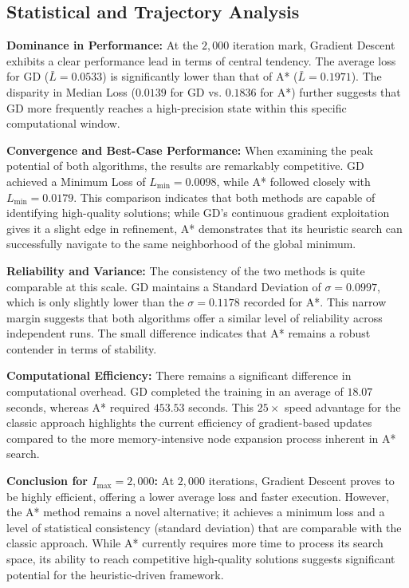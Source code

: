 \subsection*{Statistical and Trajectory Analysis}

\noindent \textbf{Dominance in Performance:} At the $2,000$ iteration mark, Gradient Descent exhibits a clear performance lead in terms of central tendency. The average loss for GD ($\bar{L} = 0.0533$) is significantly lower than that of A* ($\bar{L} = 0.1971$). The disparity in Median Loss ($0.0139$ for GD vs. $0.1836$ for A*) further suggests that GD more frequently reaches a high-precision state within this specific computational window.

\noindent \textbf{Convergence and Best-Case Performance:} When examining the peak potential of both algorithms, the results are remarkably competitive. GD achieved a Minimum Loss of $L_{\min} = 0.0098$, while A* followed closely with $L_{\min} = 0.0179$. This comparison indicates that both methods are capable of identifying high-quality solutions; while GD’s continuous gradient exploitation gives it a slight edge in refinement, A* demonstrates that its heuristic search can successfully navigate to the same neighborhood of the global minimum.

\noindent \textbf{Reliability and Variance:} The consistency of the two methods is quite comparable at this scale. GD maintains a Standard Deviation of $\sigma = 0.0997$, which is only slightly lower than the $\sigma = 0.1178$ recorded for A*. This narrow margin suggests that both algorithms offer a similar level of reliability across independent runs. The small difference indicates that A* remains a robust contender in terms of stability.

\noindent \textbf{Computational Efficiency:} There remains a significant difference in computational overhead. GD completed the training in an average of $18.07$ seconds, whereas A* required $453.53$ seconds. This $25\times$ speed advantage for the classic approach highlights the current efficiency of gradient-based updates compared to the more memory-intensive node expansion process inherent in A* search.

\noindent \textbf{Conclusion for $I_{\text{max}}=2,000$:} At $2,000$ iterations, Gradient Descent proves to be highly efficient, offering a lower average loss and faster execution. However, the A* method remains a novel alternative; it achieves a minimum loss and a level of statistical consistency (standard deviation) that are comparable with the classic approach. While A* currently requires more time to process its search space, its ability to reach competitive high-quality solutions suggests significant potential for the heuristic-driven framework.
\newpage

